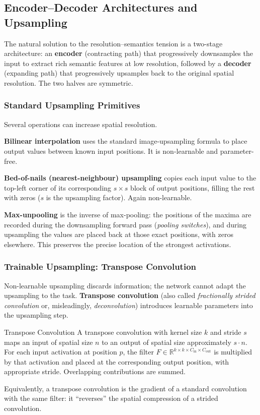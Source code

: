 \documentclass[11pt,a4paper]{article}
\newcommand{\term}[1]{\textcolor{DefGreen}{\textbf{#1}}}
\begin{document}
\subsection{Encoder--Decoder Architectures and Upsampling}
\label{sec:enc_dec}

The natural solution to the resolution--semantics tension is a two-stage architecture: an \term{encoder} (contracting path) that progressively downsamples the input to extract rich semantic features at low resolution, followed by a \term{decoder} (expanding path) that progressively upsamples back to the original spatial resolution. The two halves are symmetric.

\subsubsection{Standard Upsampling Primitives}

Several operations can increase spatial resolution.

\textbf{Bilinear interpolation} uses the standard image-upsampling formula to place output values between known input positions. It is non-learnable and parameter-free.

\textbf{Bed-of-nails (nearest-neighbour) upsampling} copies each input value to the top-left corner of its corresponding $s\times s$ block of output positions, filling the rest with zeros ($s$ is the upsampling factor). Again non-learnable.

\textbf{Max-unpooling} is the inverse of max-pooling: the positions of the maxima are recorded during the downsampling forward pass (\emph{pooling switches}), and during upsampling the values are placed back at those exact positions, with zeros elsewhere. This preserves the precise location of the strongest activations.

\subsubsection{Trainable Upsampling: Transpose Convolution}

Non-learnable upsampling discards information; the network cannot adapt the upsampling to the task. \term{Transpose convolution} (also called \emph{fractionally strided convolution} or, misleadingly, \emph{deconvolution}) introduces learnable parameters into the upsampling step.

\begin{defbox}{Transpose Convolution}
A transpose convolution with kernel size $k$ and stride $s$ maps an input of spatial size $n$ to an output of spatial size approximately $s \cdot n$. For each input activation at position $p$, the filter $F \in \mathbb{R}^{k \times k \times C_\text{in} \times C_\text{out}}$ is multiplied by that activation and placed at the corresponding output position, with appropriate stride. Overlapping contributions are summed.

Equivalently, a transpose convolution is the gradient of a standard convolution with the same filter: it ``reverses'' the spatial compression of a strided convolution.
\end{defbox}
\end{document}
